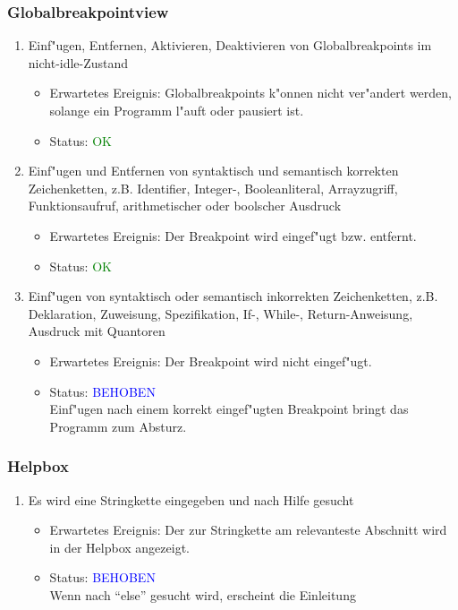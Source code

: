 \subsubsection{Globalbreakpointview}
\begin{enumerate}
\item Einf"ugen, Entfernen, Aktivieren, Deaktivieren von Globalbreakpoints im nicht-idle-Zustand
\begin{itemize}
\item Erwartetes Ereignis: Globalbreakpoints k"onnen nicht ver"andert werden, solange ein Programm l"auft oder pausiert ist. 
\item Status: \textcolor{green}{OK}
\end{itemize}
\item Einf"ugen und Entfernen von syntaktisch und semantisch korrekten Zeichenketten, z.B. Identifier, Integer-, Booleanliteral, Arrayzugriff, Funktionsaufruf, arithmetischer oder boolscher Ausdruck
\begin{itemize}
\item Erwartetes Ereignis: Der Breakpoint wird eingef"ugt bzw. entfernt. 
\item Status: \textcolor{green}{OK}
\end{itemize}
\item Einf"ugen von syntaktisch oder semantisch inkorrekten Zeichenketten, z.B. Deklaration, Zuweisung, Spezifikation, If-, While-, Return-Anweisung, Ausdruck mit Quantoren
\begin{itemize}
\item Erwartetes Ereignis: Der Breakpoint wird nicht eingef"ugt. 
\item Status: \textcolor{blue}{BEHOBEN} \\
Einf"ugen nach einem korrekt eingef"ugten Breakpoint bringt das Programm zum Absturz.
\end{itemize}
\end{enumerate}
\subsubsection{Helpbox}
\begin{enumerate}
\item Es wird eine Stringkette eingegeben und nach Hilfe gesucht
\begin{itemize}
\item Erwartetes Ereignis: Der zur Stringkette am relevanteste Abschnitt wird in der Helpbox angezeigt. 
\item Status: \textcolor{blue}{BEHOBEN} \\
Wenn nach "`else"' gesucht wird, erscheint die Einleitung
\end{itemize}
\end{enumerate}

